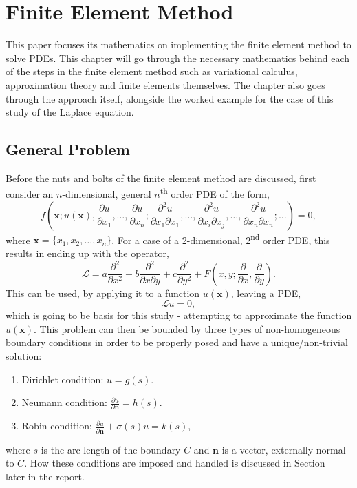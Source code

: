 \clearpage
\chapter{Finite Element Method}

This paper focuses its mathematics on implementing the finite element method to solve PDEs. This chapter will go through the necessary mathematics behind each of the steps in the finite element method such as variational calculus, approximation theory and finite elements themselves. The chapter also goes through the approach itself, alongside the worked example for the case of this study of the Laplace equation.

\section{General Problem}

Before the nuts and bolts of the finite element method are discussed, first consider an $n$-dimensional, general $n$\textsuperscript{th} order PDE of the form,
\begin{equation}
	f\left(\mathbf{x}; u(\mathbf{x}), \frac{\partial u}{\partial x_1},\dots, \frac{\partial u}{\partial x_n}; \frac{\partial^2 u}{\partial x_1 \partial x_1},\dots,\frac{\partial^2 u}{\partial x_i \partial x_j},\dots, \frac{\partial^2 u}{\partial x_n \partial x_n}; \dots\right) = 0,
\end{equation}
where $\mathbf{x} = \{x_1,x_2,\dots,x_n\}$.
For a case of a 2-dimensional, 2\textsuperscript{nd} order PDE, this results in ending up with the operator,
\begin{equation}
	\mathcal{L} = a \frac{\partial^2}{\partial x^2} + b \frac{\partial^2}{\partial x \partial y} + c \frac{\partial^2}{\partial y^2} + F\left(x,y; \frac{\partial}{\partial x}, \frac{\partial}{\partial y}\right).
\end{equation}
This can be used, by applying it to a function $u(\mathbf{x})$, leaving a PDE,
\begin{equation}\label{pde}
	\mathcal{L}u = 0,
\end{equation}
which is going to be basis for this study - attempting to approximate the function $u(\mathbf{x})$. This problem can then be bounded by three types of non-homogeneous boundary conditions in order to be properly posed and have a unique/non-trivial solution:
\begin{enumerate}
	\item Dirichlet condition: $u=g(s)$.
	\item Neumann condition: $\frac{\partial u}{\partial \mathbf{n}} = h(s)$.
	\item Robin condition: $\frac{\partial u}{\partial \mathbf{n}} + \sigma(s)u = k(s)$,
\end{enumerate}
where $s$ is the arc length of the boundary $C$ and $\mathbf{n}$ is a vector, externally normal to $C$. How these conditions are imposed and handled is discussed in Section~\, later in the report.

